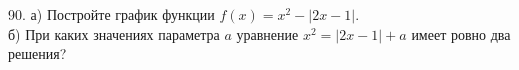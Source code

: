 90. а) Постройте график функции $f(x)=x^2-|2x-1|.$\\
б) При каких значениях параметра $a$ уравнение $x^2=|2x-1|+a$ имеет ровно два решения?\\
